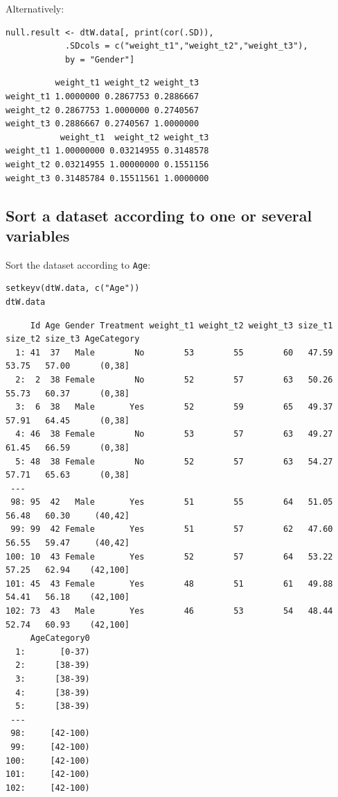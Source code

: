 \documentclass{article}
\begin{document}
Alternatively:
\lstset{language=r,label= ,caption= ,captionpos=b,numbers=none}
\begin{lstlisting}
null.result <- dtW.data[, print(cor(.SD)), 
			.SDcols = c("weight_t1","weight_t2","weight_t3"), 
			by = "Gender"]
\end{lstlisting}

\begin{verbatim}
          weight_t1 weight_t2 weight_t3
weight_t1 1.0000000 0.2867753 0.2886667
weight_t2 0.2867753 1.0000000 0.2740567
weight_t3 0.2886667 0.2740567 1.0000000
           weight_t1  weight_t2 weight_t3
weight_t1 1.00000000 0.03214955 0.3148578
weight_t2 0.03214955 1.00000000 0.1551156
weight_t3 0.31485784 0.15511561 1.0000000
\end{verbatim}

\subsection{Sort a dataset according to one or several variables}
\label{sec:org30b573a}

Sort the dataset according to \texttt{Age}:
\lstset{language=r,label= ,caption= ,captionpos=b,numbers=none}
\begin{lstlisting}
setkeyv(dtW.data, c("Age"))
dtW.data
\end{lstlisting}

\begin{verbatim}
     Id Age Gender Treatment weight_t1 weight_t2 weight_t3 size_t1 size_t2 size_t3 AgeCategory
  1: 41  37   Male        No        53        55        60   47.59   53.75   57.00      (0,38]
  2:  2  38 Female        No        52        57        63   50.26   55.73   60.37      (0,38]
  3:  6  38   Male       Yes        52        59        65   49.37   57.91   64.45      (0,38]
  4: 46  38 Female        No        53        57        63   49.27   61.45   66.59      (0,38]
  5: 48  38 Female        No        52        57        63   54.27   57.71   65.63      (0,38]
 ---                                                                                          
 98: 95  42   Male       Yes        51        55        64   51.05   56.48   60.30     (40,42]
 99: 99  42 Female       Yes        51        57        62   47.60   56.55   59.47     (40,42]
100: 10  43 Female       Yes        52        57        64   53.22   57.25   62.94    (42,100]
101: 45  43 Female       Yes        48        51        61   49.88   54.41   56.18    (42,100]
102: 73  43   Male       Yes        46        53        54   48.44   52.74   60.93    (42,100]
     AgeCategory0
  1:       [0-37)
  2:      [38-39)
  3:      [38-39)
  4:      [38-39)
  5:      [38-39)
 ---             
 98:     [42-100)
 99:     [42-100)
100:     [42-100)
101:     [42-100)
102:     [42-100)
\end{verbatim}
\end{document}
